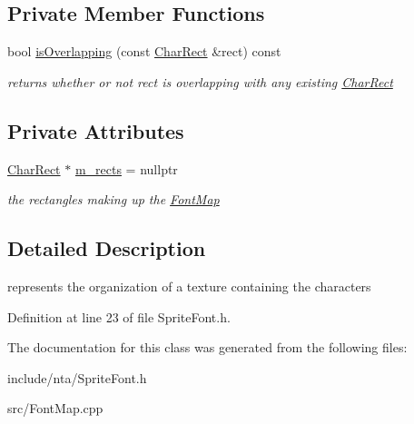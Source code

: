 \subsection*{Private Member Functions}
\begin{DoxyCompactItemize}
\item 
\mbox{\label{classnta_1_1FontMap_aae874cb1975e6be920bf785f34f14c3e}} 
bool \hyperlink{classnta_1_1FontMap_aae874cb1975e6be920bf785f34f14c3e}{is\+Overlapping} (const \hyperlink{structnta_1_1FontMap_1_1CharRect}{Char\+Rect} \&rect) const
\begin{DoxyCompactList}\small\item\em returns whether or not rect is overlapping with any existing \hyperlink{structnta_1_1FontMap_1_1CharRect}{Char\+Rect} \end{DoxyCompactList}\end{DoxyCompactItemize}
\subsection*{Private Attributes}
\begin{DoxyCompactItemize}
\item 
\mbox{\label{classnta_1_1FontMap_a24e415fd025230fce6a304a3dfd320a8}} 
\hyperlink{structnta_1_1FontMap_1_1CharRect}{Char\+Rect} $\ast$ \hyperlink{classnta_1_1FontMap_a24e415fd025230fce6a304a3dfd320a8}{m\+\_\+rects} = nullptr
\begin{DoxyCompactList}\small\item\em the rectangles making up the \hyperlink{classnta_1_1FontMap}{Font\+Map} \end{DoxyCompactList}\end{DoxyCompactItemize}


\subsection{Detailed Description}
represents the organization of a texture containing the characters 

Definition at line 23 of file Sprite\+Font.\+h.



The documentation for this class was generated from the following files\+:\begin{DoxyCompactItemize}
\item 
include/nta/Sprite\+Font.\+h\item 
src/Font\+Map.\+cpp\end{DoxyCompactItemize}
